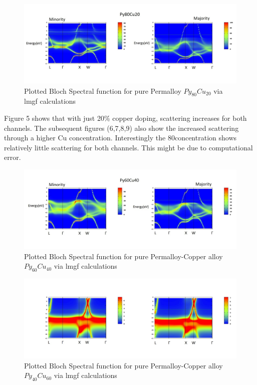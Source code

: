 \documentclass[12pt]{article}
\begin{document}
\begin{figure}[htp]
    \centering
    \begin{measuredfigure}
    \includegraphics[scale=0.40]{specfunc/cu20}
    \caption{Plotted Bloch Spectral function for pure Permalloy $Py_{80}Cu_{20}$ via lmgf calculations}
    \end{measuredfigure}
    \end{figure}
\clearpage
Figure 5 shows that with just 20\% copper doping, scattering increases for both channels. The subsequent figures (6,7,8,9) also show the increased scattering through a higher Cu concentration. Interestingly the 80\Cu concentration shows relatively little scattering for both channels. This might be due to computational error.
\begin{figure}[htp]
    \centering
    \begin{measuredfigure}
    \includegraphics[scale=0.40]{specfunc/cu40}
    \caption{Plotted Bloch Spectral function for pure Permalloy-Copper alloy $Py_{60}Cu_{40}$ via lmgf calculations}
    \end{measuredfigure}
    \end{figure}
\begin{figure}[htp]
    \centering
    \begin{measuredfigure}
    \includegraphics[scale=0.40]{specfunc/cu60}
    \caption{Plotted Bloch Spectral function for pure Permalloy-Copper alloy $Py_{40}Cu_{60}$ via lmgf calculations}
    \end{measuredfigure}
    \end{figure}
\end{document}
